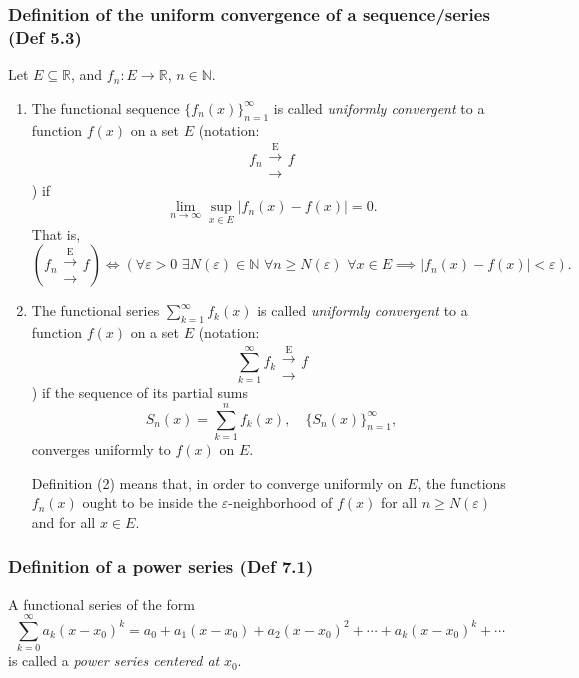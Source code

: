\subsubsection{Definition of the uniform convergence of a sequence/series (Def 5.3)}

Let $E \subseteq \mathbb{R}$, and $f_n : E \to \mathbb{R}$, $n \in \mathbb{N}$.

\begin{enumerate}
    \item The functional sequence $\{f_n(x)\}_{n=1}^\infty$ is called \textit{uniformly convergent} to a function $f(x)$ on a set $E$ (notation:
    \[
        f_n \mathrel{\substack{\xrightarrow{\text{E}} \\[-0.3em] \xrightarrow{\text{}}}} f
    \]
    ) if
    \[
        \lim_{n \to \infty} \sup_{x \in E} \left| f_n(x) - f(x) \right| = 0.
    \]
    That is,
    \[
        \left(f_n \mathrel{\substack{\xrightarrow{\text{E}} \\[-0.3em] \xrightarrow{\text{}}}} f\right) \iff
        \left(\forall \varepsilon > 0 \,\, \exists N(\varepsilon) \in \mathbb{N} \, \,
        \forall n \geq N(\varepsilon) \,\, \forall x \in E \implies |f_n(x) - f(x)| < \varepsilon\right).
    \]

    \item The functional series $\sum_{k=1}^\infty f_k(x)$ is called \textit{uniformly convergent} to a function $f(x)$ on a set $E$ (notation:
    \[\sum_{k=1}^\infty f_k \mathrel{\substack{\xrightarrow{\text{E}} \\[-0.3em] \xrightarrow{\text{}}}} f
    \]) if the sequence of its partial sums
    \[
        S_n(x) = \sum_{k=1}^n f_k(x), \quad \{S_n(x)\}_{n=1}^\infty,
    \]
    converges uniformly to $f(x)$ on $E$.

    Definition (2) means that, in order to converge uniformly on $E$, the functions $f_n(x)$ ought to be inside the $\varepsilon$-neighborhood of $f(x)$ for all $n \geq N(\varepsilon)$ and for all $x \in E$.
\end{enumerate}

\subsubsection{Definition of a power series (Def 7.1)}

A functional series of the form
\[
    \sum_{k=0}^\infty a_k (x - x_0)^k = a_0 + a_1 (x - x_0) + a_2 (x - x_0)^2 + \cdots + a_k (x - x_0)^k + \cdots
\]
is called a \textit{power series centered at} $x_0$.

